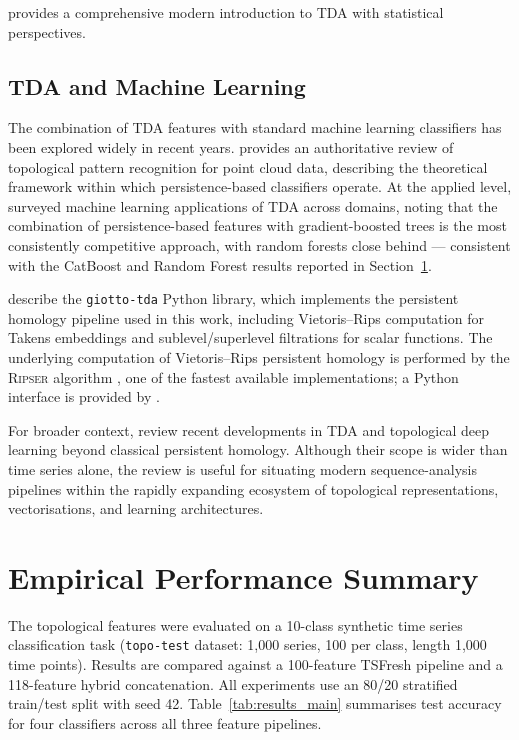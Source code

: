 \documentclass[12pt, a4paper]{article}
\theoremstyle{definition}
\theoremstyle{plain}
\begin{document}
\citet{chazal2021introduction} provides a comprehensive modern introduction to
TDA with statistical perspectives.

\subsection{TDA and Machine Learning}

The combination of TDA features with standard machine learning classifiers has
been explored widely in recent years. \citet{carlsson2020topological} provides
an authoritative review of topological pattern recognition for point cloud data,
describing the theoretical framework within which persistence-based classifiers
operate. At the applied level, \citet{hensel2021survey} surveyed machine learning
applications of TDA across domains, noting that the combination of
persistence-based features with gradient-boosted trees is the most consistently
competitive approach, with random forests close behind — consistent with the
CatBoost and Random Forest results reported in Section~\ref{sec:results_summary}.

\citet{giotto2021} describe the \texttt{giotto-tda} Python library, which implements
the persistent homology pipeline used in this work, including Vietoris--Rips
computation for Takens embeddings and sublevel/superlevel filtrations for scalar
functions. The underlying computation of Vietoris--Rips persistent homology is
performed by the \textsc{Ripser} algorithm \citep{bauer2021ripser}, one of the
fastest available implementations; a Python interface is provided by
\citet{tralie2018ripser}.

For broader context, \citet{su2025review} review recent developments in TDA and
topological deep learning beyond classical persistent homology. Although their
scope is wider than time series alone, the review is useful for situating modern
sequence-analysis pipelines within the rapidly expanding ecosystem of topological
representations, vectorisations, and learning architectures.

\section{Empirical Performance Summary}
\label{sec:results_summary}

The topological features were evaluated on a 10-class synthetic time series
classification task (\texttt{topo-test} dataset: 1,000 series, 100 per class,
length 1,000 time points). Results are compared against a 100-feature TSFresh
pipeline and a 118-feature hybrid concatenation. All experiments use an 80/20
stratified train/test split with seed 42. Table~\ref{tab:results_main} summarises
test accuracy for four classifiers across all three feature pipelines.
\end{document}
